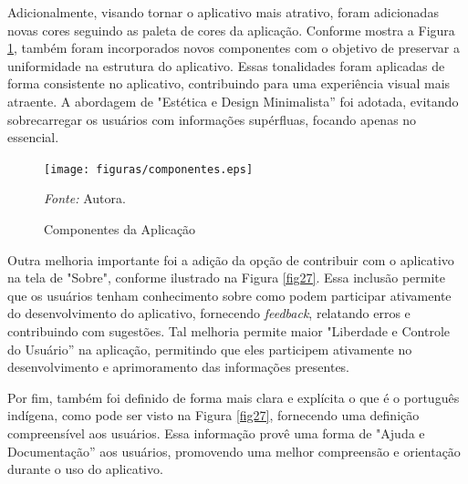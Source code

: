 Adicionalmente, visando tornar o aplicativo mais atrativo, foram adicionadas novas cores seguindo as paleta de cores da aplicação. Conforme mostra a Figura \ref{fig26}, também foram incorporados novos componentes com o objetivo de preservar a uniformidade na estrutura do aplicativo.
Essas tonalidades foram aplicadas de forma consistente no aplicativo, contribuindo para uma experiência visual mais atraente. A abordagem de "Estética e Design Minimalista'' foi adotada, evitando sobrecarregar os usuários com informações supérfluas, focando apenas no essencial.

\begin{figure}[h!]
	\centering
	\caption{Componentes da Aplicação}
	\begin{adjustbox}{center}
		\texttt{[image: figuras/componentes.eps]}
	\end{adjustbox}
	\begin{tablenotes}[flushleft]
		\centering
		\item \textit{Fonte:} Autora.
	\end{tablenotes}
	\label{fig26}
\end{figure}

Outra melhoria importante foi a adição da opção de contribuir com o aplicativo na tela de "Sobre", conforme ilustrado na Figura \ref{fig27}. Essa inclusão permite que os usuários tenham conhecimento sobre como podem participar ativamente do desenvolvimento do aplicativo, 
fornecendo \textit{feedback}, relatando erros e contribuindo com sugestões. Tal melhoria permite maior "Liberdade e Controle do Usuário'' na aplicação, permitindo que eles participem ativamente no desenvolvimento e aprimoramento 
das informações presentes.

Por fim, também foi definido de forma mais clara e explícita o que é o português indígena, como pode ser visto na Figura \ref{fig27}, fornecendo uma definição compreensível aos usuários. Essa informação provê uma forma de "Ajuda e Documentação'' aos usuários, promovendo uma melhor 
compreensão e orientação durante o uso do aplicativo.

